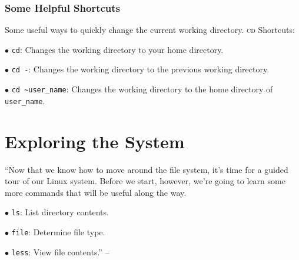 \documentclass[oneside]{book}
\numberwithin{equation}{section}
\begin{document}
\subsubsection{Some Helpful Shortcuts}
Some useful ways to quickly change the current working directory. \textsc{cd} Shortcuts:
\begin{enumerate*}
	\item[$\bullet$] \texttt{cd}: Changes the working directory to your home directory.
	\item[$\bullet$] \texttt{cd -}: Changes the working directory to the previous working directory.
	\item[$\bullet$] \verb|cd ~user_name|: Changes the working directory to the home directory of \verb|user_name|.
\end{enumerate*}


\section{Exploring the System}
``Now that we know how to move around the file system, it's time for a guided tour of our Linux system. Before we start, however, we're going to learn some more commands that will be useful along the way.
\begin{enumerate*}
	\item[$\bullet$] \texttt{ls}: List directory contents.
	\item[$\bullet$] \texttt{file}: Determine file type.
	\item[$\bullet$] \texttt{less}: View file contents.'' -- \cite[p. 50]{Shotts2019}
\end{enumerate*}
\end{document}

